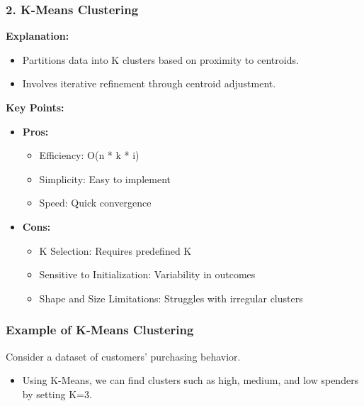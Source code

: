 \documentclass[aspectratio=169]{beamer}
\begin{document}
\begin{frame}[fragile]
    \frametitle{2. K-Means Clustering}
    \textbf{Explanation:}
    \begin{itemize}
        \item Partitions data into K clusters based on proximity to centroids.
        \item Involves iterative refinement through centroid adjustment.
    \end{itemize}

    \textbf{Key Points:}
    \begin{itemize}
        \item \textbf{Pros:}
        \begin{itemize}
            \item Efficiency: O(n * k * i)
            \item Simplicity: Easy to implement
            \item Speed: Quick convergence
        \end{itemize}
        \item \textbf{Cons:}
        \begin{itemize}
            \item K Selection: Requires predefined K
            \item Sensitive to Initialization: Variability in outcomes
            \item Shape and Size Limitations: Struggles with irregular clusters
        \end{itemize}
    \end{itemize}
\end{frame}

\begin{frame}[fragile]
    \frametitle{Example of K-Means Clustering}
    Consider a dataset of customers' purchasing behavior. 
    \begin{itemize}
        \item Using K-Means, we can find clusters such as high, medium, and low spenders by setting K=3.
    \end{itemize}
\end{frame}
\end{document}
